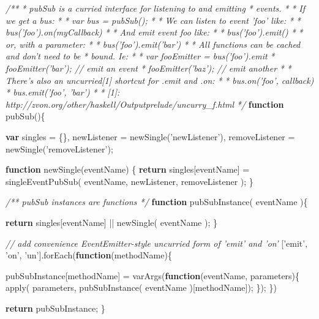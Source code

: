 \documentclass[12pt, ]{article}
\newenvironment{Shaded}{}{}
\newcommand{\KeywordTok}[1]{\textcolor[rgb]{0.00,0.44,0.13}{\textbf{{#1}}}}
\newcommand{\StringTok}[1]{\textcolor[rgb]{0.25,0.44,0.63}{{#1}}}
\newcommand{\CommentTok}[1]{\textcolor[rgb]{0.38,0.63,0.69}{\textit{{#1}}}}
\newcommand{\FunctionTok}[1]{\textcolor[rgb]{0.02,0.16,0.49}{{#1}}}
\newcommand{\NormalTok}[1]{{#1}}
\begin{document}
\begin{Shaded}
\begin{Highlighting}[]
\CommentTok{/**}
\CommentTok{ * pubSub is a curried interface for listening to and emitting}
\CommentTok{ * events.}
\CommentTok{ * }
\CommentTok{ * If we get a bus:}
\CommentTok{ *    }
\CommentTok{ *    var bus = pubSub();}
\CommentTok{ * }
\CommentTok{ * We can listen to event 'foo' like:}
\CommentTok{ * }
\CommentTok{ *    bus('foo').on(myCallback)}
\CommentTok{ *    }
\CommentTok{ * And emit event foo like:}
\CommentTok{ * }
\CommentTok{ *    bus('foo').emit()}
\CommentTok{ *    }
\CommentTok{ * or, with a parameter:}
\CommentTok{ * }
\CommentTok{ *    bus('foo').emit('bar')}
\CommentTok{ *     }
\CommentTok{ * All functions can be cached and don't need to be }
\CommentTok{ * bound. Ie:}
\CommentTok{ * }
\CommentTok{ *    var fooEmitter = bus('foo').emit}
\CommentTok{ *    fooEmitter('bar');  // emit an event}
\CommentTok{ *    fooEmitter('baz');  // emit another}
\CommentTok{ *    }
\CommentTok{ * There's also an uncurried[1] shortcut for .emit and .on:}
\CommentTok{ * }
\CommentTok{ *    bus.on('foo', callback)}
\CommentTok{ *    bus.emit('foo', 'bar')}
\CommentTok{ * }
\CommentTok{ * [1]: http://zvon.org/other/haskell/Outputprelude/uncurry_f.html}
\CommentTok{ */}
\KeywordTok{function} \FunctionTok{pubSub}\NormalTok{()\{}

   \KeywordTok{var} \NormalTok{singles = \{\},}
       \NormalTok{newListener = }\FunctionTok{newSingle}\NormalTok{(}\StringTok{'newListener'}\NormalTok{),}
       \NormalTok{removeListener = }\FunctionTok{newSingle}\NormalTok{(}\StringTok{'removeListener'}\NormalTok{); }
      
   \KeywordTok{function} \FunctionTok{newSingle}\NormalTok{(eventName) \{}
      \KeywordTok{return} \NormalTok{singles[eventName] = }\FunctionTok{singleEventPubSub}\NormalTok{(}
         \NormalTok{eventName, }
         \NormalTok{newListener, }
         \NormalTok{removeListener}
      \NormalTok{);   }
   \NormalTok{\}      }

   \CommentTok{/** pubSub instances are functions */}
   \KeywordTok{function} \FunctionTok{pubSubInstance}\NormalTok{( eventName )\{   }
      
      \KeywordTok{return} \NormalTok{singles[eventName] || }\FunctionTok{newSingle}\NormalTok{( eventName );   }
   \NormalTok{\}}

   \CommentTok{// add convenience EventEmitter-style uncurried form of 'emit' and 'on'}
   \NormalTok{[}\StringTok{'emit'}\NormalTok{, }\StringTok{'on'}\NormalTok{, }\StringTok{'un'}\NormalTok{].}\FunctionTok{forEach}\NormalTok{(}\KeywordTok{function}\NormalTok{(methodName)\{}
   
      \NormalTok{pubSubInstance[methodName] = }\FunctionTok{varArgs}\NormalTok{(}\KeywordTok{function}\NormalTok{(eventName, parameters)\{}
         \FunctionTok{apply}\NormalTok{( parameters, }\FunctionTok{pubSubInstance}\NormalTok{( eventName )[methodName]);}
      \NormalTok{\});   }
   \NormalTok{\})}
         
   \KeywordTok{return} \NormalTok{pubSubInstance;}
\NormalTok{\}}
\end{Highlighting}
\end{Shaded}
\end{document}
